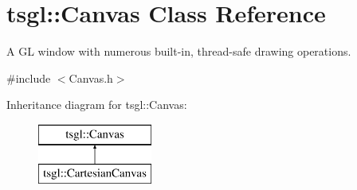 \hypertarget{classtsgl_1_1_canvas}{}\section{tsgl\+:\+:Canvas Class Reference}
\label{classtsgl_1_1_canvas}


A GL window with numerous built-\/in, thread-\/safe drawing operations.  




{\ttfamily \#include $<$Canvas.\+h$>$}

Inheritance diagram for tsgl\+:\+:Canvas\+:\begin{figure}[H]
\begin{center}
\leavevmode
\includegraphics[height=2.000000cm]{classtsgl_1_1_canvas}
\end{center}
\end{figure}
